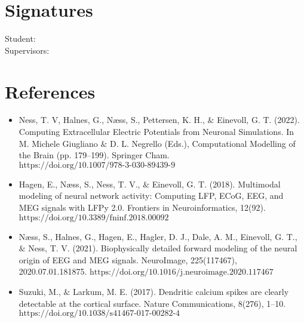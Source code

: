 \documentclass[a4paper,onecolumn,11pt]{revtex4-1}
\begin{document}
\section*{Signatures}

Student:  \newline
\\
Supervisors:
\\
\newline


\section*{References}
\begin{itemize}
\item Ness, T. V, Halnes, G., Næss, S., Pettersen, K. H., $\&$ Einevoll, G. T. (2022). Computing Extracellular Electric Potentials from Neuronal Simulations. In M. Michele Giugliano $\&$ D. L. Negrello (Eds.), Computational Modelling of the Brain (pp. 179–199). Springer Cham. $\text{https://doi.org/10.1007/978-3-030-89439-9}$

\item Hagen, E., Næss, S., Ness, T. V., $\&$ Einevoll, G. T. (2018). Multimodal modeling of neural network activity: Computing LFP, ECoG, EEG, and MEG signals with LFPy 2.0. Frontiers in Neuroinformatics, 12(92). $\text{https://doi.org/10.3389/fninf.2018.00092}$

\item Næss, S., Halnes, G., Hagen, E., Hagler, D. J., Dale, A. M., Einevoll, G. T., $\&$ Ness, T. V. (2021). Biophysically detailed forward modeling of the neural origin of EEG and MEG signals. NeuroImage, 225(117467), 2020.07.01.181875. $\text{https://doi.org/10.1016/j.neuroimage.2020.117467}$

\item Suzuki, M., $\&$ Larkum, M. E. (2017). Dendritic calcium spikes are clearly detectable at the cortical surface. Nature Communications, 8(276), 1–10. \newline
$\text{https://doi.org/10.1038/s41467-017-00282-4}$

\end{itemize}
\end{document}

